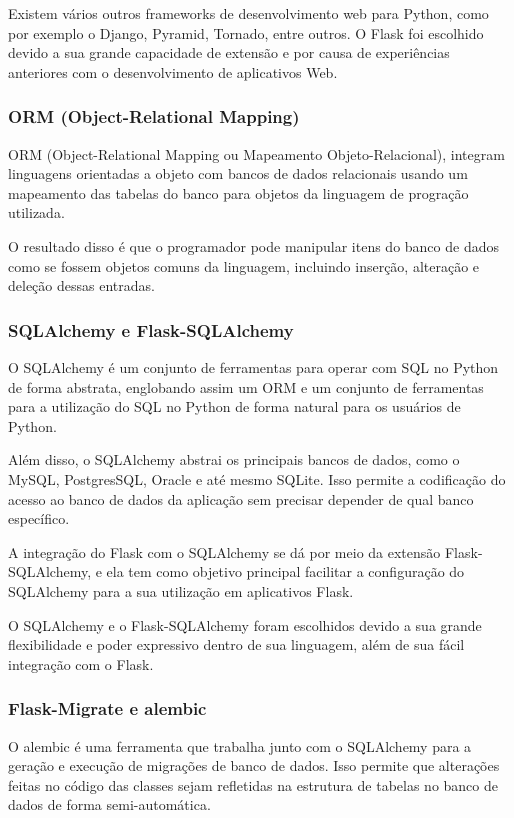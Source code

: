 \documentclass[
	article,			%
	11pt,				%
	oneside,			%
	a4paper,			%
	english,			%
	brazil,				%
	sumario=tradicional
	]{abntex2}
\begin{document}
Existem vários outros frameworks de desenvolvimento web para Python, como por exemplo o Django, Pyramid, Tornado, entre outros.
O Flask foi escolhido devido a sua grande capacidade de extensão e por causa de experiências anteriores com o desenvolvimento de aplicativos Web.

\subsubsection{ORM (Object-Relational Mapping)}

ORM (Object-Relational Mapping ou Mapeamento Objeto-Relacional), integram linguagens orientadas a objeto com bancos de dados relacionais usando um mapeamento das tabelas do banco para objetos da linguagem de progração utilizada. \cite{barry}

O resultado disso é que o programador pode manipular itens do banco de dados como se fossem objetos comuns da linguagem, incluindo inserção, alteração e deleção dessas entradas.

\subsubsection{SQLAlchemy e Flask-SQLAlchemy}

O SQLAlchemy é um conjunto de ferramentas para operar com SQL no Python de forma abstrata, englobando assim um ORM e um conjunto de ferramentas para a utilização do SQL no Python de forma natural para os usuários de Python. \cite{sqlalchemy}

Além disso, o SQLAlchemy abstrai os principais bancos de dados, como o MySQL, PostgresSQL, Oracle e até mesmo SQLite.
Isso permite a codificação do acesso ao banco de dados da aplicação sem precisar depender de qual banco específico.

A integração do Flask com o SQLAlchemy se dá por meio da extensão Flask-SQLAlchemy, e ela tem como objetivo principal facilitar a configuração do SQLAlchemy para a sua utilização em aplicativos Flask. \cite{flasksqlalchemy}

O SQLAlchemy e o Flask-SQLAlchemy foram escolhidos devido a sua grande flexibilidade e poder expressivo dentro de sua linguagem, além de sua fácil integração com o Flask.

\subsubsection{Flask-Migrate e alembic}

O alembic é uma ferramenta que trabalha junto com o SQLAlchemy para a geração e execução de migrações de banco de dados.
Isso permite que alterações feitas no código das classes sejam refletidas na estrutura de tabelas no banco de dados de forma semi-automática. \cite{alembic}
\end{document}
